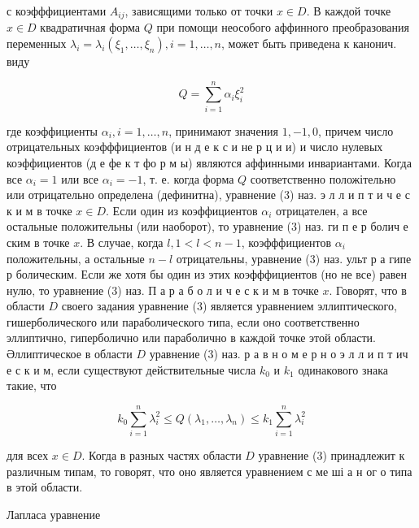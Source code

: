 \documentclass[10pt]{article}
\begin{document}
с коэфффициентами $A_{i j}$, зависящими только от точки $x \in D$. В каждой точке $x \in D$ квадратичная форма $Q$ при помощи неособого аффинного преобразования переменных $\lambda_{i}=\lambda_{i}\left(\xi_{1}, \ldots, \xi_{n}\right), i=1, \ldots, n$, может быть приведена к канонич. виду



\[

Q=\sum_{i=1}^{n} \alpha_{i} \xi_{i}^{2}

\]



где коэффициенты $\alpha_{i}, i=1, \ldots, n$, принимают значения $1,-1,0$, причем число отрицательных коэфффициентов (и н д е к с и не р ц и и) и число нулевых коэффициентов (д е фе к т фо р м ы) являются аффинными инвариантами. Когда все $\alpha_{i}=1$ или все $\alpha_{i}=-1$, т. е. когда форма $Q$ соответственно положітельно или отрицательно определена (дефинитна), уравнение (3) наз. э л л и п т и ч е с к и м в точке $x \in D$. Если один из коэффициентов $\alpha_{i}$ отрицателен, а все остальные положительны (или наоборот), то уравнение (3) наз. ги п е р болич е ским в точке $x$. В случае, когда $l, 1<l<n-1$, коэфффициентов $\alpha_{i}$ положительны, а остальные $n-l$ отрицательны, уравнение (3) наз. ульт р а гипе р болическим. Если же хотя бы один из этих коэфффициентов (но не все) равен нулю, то уравнение (3) наз. П а р а б о л и ч е с к и м в точке $x$. Говорят, что в области $D$ своего задания уравнение (3) является уравнением эллиптического, гишерболического или параболического типа, если оно соответственно эллиптично, гиперболично или параболично в каждой точке этой области. Әллиптическое в области $D$ уравнение (3) наз. р а в н о м е р н о э л л и п т ич е с к и м, если существуют действительные числа $k_{0}$ и $k_{1}$ одинакового знака такие, что



\[

k_{0} \sum_{i=1}^{n} \lambda_{i}^{2} \leqslant Q\left(\lambda_{1}, \ldots, \lambda_{n}\right) \leqslant k_{1} \sum_{i=1}^{n} \lambda_{i}^{2}

\]



для всех $x \in D$. Когда в разных частях области $D$ уравнение (3) принадлежит к различным типам, то говорят, что оно является уравнением с ме ші а н ог о типа в этой области.



Лапласа уравнение
\end{document}
